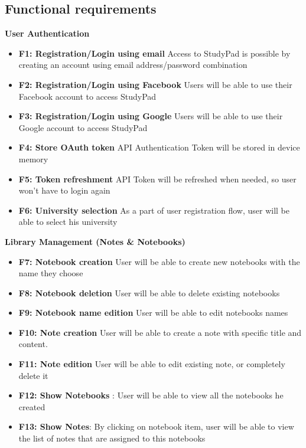 \documentclass[thesis=B,english]{FITthesis}[2012/10/20]
\newcommand{\appname}{StudyPad \space}
\begin{document}
\subsection{Functional requirements}
\bigskip
\textbf{User Authentication}
\begin{itemize}
	\item \textbf{F1: Registration/Login using email} Access to \appname is possible by creating an account using email address/password combination
	\item \textbf{F2: Registration/Login using Facebook} Users will be able to use their Facebook account to access \appname
	\item \textbf{F3: Registration/Login using Google} Users will be able to use their Google account to access \appname
	\item \textbf{F4: Store OAuth token} API Authentication Token will be stored in device memory
	\item \textbf{F5: Token refreshment} API Token will be refreshed when needed, so user won't have to login again
	\item \textbf{F6: University selection} As a part of user registration flow, user will be able to select his university
\end{itemize}
\bigskip
\textbf{Library Management (Notes \& Notebooks)}
\begin{itemize}
	\item \textbf{F7: Notebook creation} User will be able to create new notebooks with the name they choose
	\item \textbf{F8: Notebook deletion} User will be able to delete existing notebooks
	\item \textbf{F9: Notebook name edition} User will be able to edit notebooks names
	\item \textbf{F10: Note creation} User will be able to create a note with specific title and content.
	\item \textbf{F11: Note edition} User will be able to edit existing note, or completely delete it
	\item \textbf{F12: Show Notebooks} : User will be able to view all the notebooks he created
	\item \textbf{F13: Show Notes}: By clicking on notebook item, user will be able to view the list of notes that are assigned to this notebooks
\end{itemize}
\end{document}
